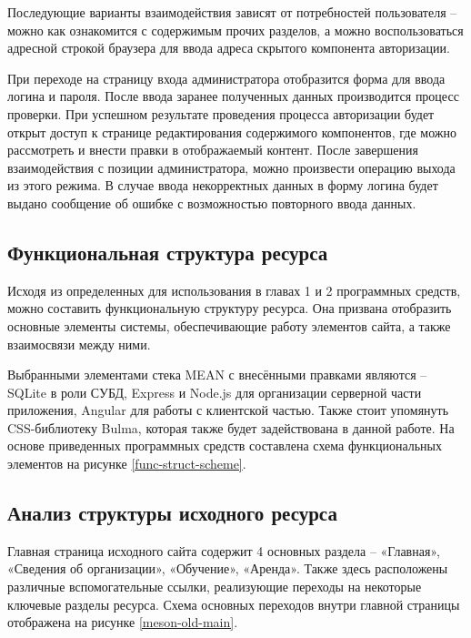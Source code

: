 Последующие варианты взаимодействия зависят от потребностей пользователя -- можно как ознакомится с содержимым прочих разделов, а можно воспользоваться адресной строкой браузера для ввода адреса скрытого компонента авторизации.

При переходе на страницу входа администратора отобразится форма для ввода логина и пароля.
После ввода заранее полученных данных производится процесс проверки.
При успешном результате проведения процесса авторизации будет открыт доступ к странице редактирования содержимого компонентов, где можно рассмотреть и внести правки в отображаемый контент.
После завершения взаимодействия с позиции администратора, можно произвести операцию выхода из этого режима.
В случае ввода некорректных данных в форму логина будет выдано сообщение об ошибке с возможностью повторного ввода данных.


\subsection{Функциональная структура ресурса}

Исходя из определенных для использования в главах 1 и 2 программных средств, можно составить функциональную структуру ресурса.
Она призвана отобразить основные элементы системы, обеспечивающие работу элементов сайта, а также взаимосвязи между ними.

Выбранными элементами стека MEAN с внесёнными правками являются -- SQLite в роли СУБД, Express и Node.js для организации серверной части приложения, Angular для работы с клиентской частью.
Также стоит упомянуть CSS-библиотеку Bulma, которая также будет задействована в данной работе.
На основе приведенных программных средств составлена схема функциональных элементов на рисунке \ref{func-struct-scheme}.



\subsection{Анализ структуры исходного ресурса}\label{Анализ структуры исходного ресурса}

Главная страница исходного сайта содержит 4 основных раздела -- «Главная», «Сведения об организации», «Обучение», «Аренда».
Также здесь расположены различные вспомогательные ссылки, реализующие переходы на некоторые ключевые разделы ресурса.
Схема основных переходов внутри главной страницы отображена на рисунке \ref{meson-old-main}.

